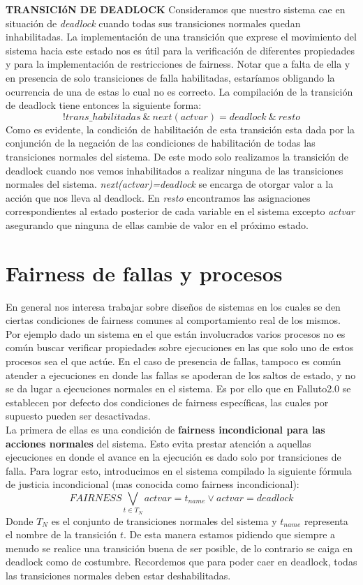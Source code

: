 \documentclass[titlepage, 12pt]{book}
\begin{document}
\textbf{TRANSICI\'oN DE DEADLOCK}
Consideramos que nuestro sistema cae en situaci\'on de \textit{deadlock} cuando todas sus transiciones normales quedan inhabilitadas. La implementaci\'on de una transici\'on que exprese el movimiento del sistema hacia este estado nos es \'util para la verificaci\'on de diferentes propiedades y para la implementaci\'on de restricciones de fairness. Notar que a falta de ella y en presencia de solo transiciones de falla habilitadas, estar\'iamos obligando la ocurrencia de una de estas lo cual no es correcto. La compilaci\'on de la transici\'on de deadlock tiene entonces la siguiente forma:
$$!trans\_habilitadas~\&~next(actvar)=deadlock~\&~resto$$
Como es evidente, la condici\'on de habilitaci\'on de esta transici\'on esta dada por la conjunci\'on de la negaci\'on de las condiciones de habilitaci\'on de todas las transiciones normales del sistema. De este modo solo realizamos la transici\'on de deadlock cuando nos vemos inhabilitados a realizar ninguna de las transiciones normales del sistema. \textit{next(actvar)=deadlock} se encarga de otorgar valor a la acci\'on que nos lleva al deadlock. En \textit{resto} encontramos las asignaciones correspondientes al estado posterior de cada variable en el sistema excepto \textit{actvar} asegurando que ninguna de ellas cambie de valor en el pr\'oximo estado.



\section{Fairness de fallas y procesos}
En general nos interesa trabajar sobre dise\~nos de sistemas en los cuales se den ciertas condiciones de fairness comunes al comportamiento real de los mismos. Por ejemplo dado un sistema en el que est\'an involucrados varios procesos no es com\'un buscar verificar propiedades sobre ejecuciones en las que solo uno de estos procesos sea el que act\'ue. En el caso de presencia de fallas, tampoco es com\'un atender a ejecuciones en donde las fallas se apoderan de los saltos de estado, y no se da lugar a ejecuciones normales en el sistema. Es por ello que en Falluto2.0 se establecen por defecto dos condiciones de fairness espec\'ificas, las cuales por supuesto pueden ser desactivadas.\\

La primera de ellas es una condici\'on de \textbf{fairness incondicional para las acciones normales} del sistema. Esto evita prestar atenci\'on a aquellas ejecuciones en donde el avance en la ejecuci\'on es dado solo por transiciones de falla. Para lograr esto, introducimos en el sistema compilado la siguiente f\'ormula de justicia incondicional (mas conocida como fairness incondicional):
$$FAIRNESS \bigvee_{t \in T_N} actvar = t_{name} \vee actvar = deadlock$$
Donde $T_N$ es el conjunto de transiciones normales del sistema y $t_{name}$ representa el nombre de la transici\'on $t$. De esta manera estamos pidiendo que siempre a menudo se realice una transici\'on buena de ser posible, de lo contrario se caiga en deadlock como de costumbre. Recordemos que para poder caer en deadlock, todas las transiciones normales deben estar deshabilitadas.\\
\end{document}
